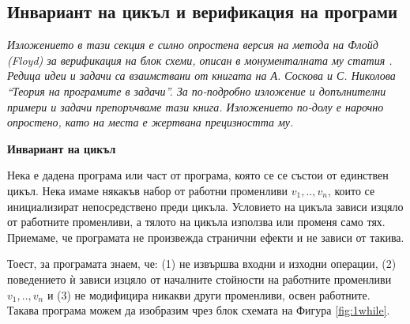 {\begin{enumerate}[resume]
\end{enumerate}

\subsection{Инвариант на цикъл и верификация на програми}

\emph{Изложението в тази секция е силно опростена версия на метода на Флойд (Floyd) за верификация на блок схеми, описан в монументалната му статия \cite{floyd}. Редица идеи и задачи са взаимствани от книгата \cite{tpsbornik} на А. Соскова и С. Николова ``Теория на програмите в задачи''. За по-подробно изложение и допълнителни примери и задачи препоръчваме тази книга. Изложението по-долу е нарочно опростено, като на места е жертвана прецизността му.}

\begin{mdframed}[hidealllines=true,backgroundcolor=gray!20]


\bigskip
\textbf{Инвариант на цикъл}
\bigskip


Нека е дадена програма или част от програма, която се се състои от единствен  цикъл. Нека имаме някакъв набор от работни променливи $v_1,..,v_n$, които се инициализират непосредствено преди  цикъла. Условието на цикъла зависи изцяло от работните променливи, а тялото на цикъла използва или променя само тях. Приемаме, че програмата не произвежда странични ефекти и не зависи от такива.

Тоест, за програмата знаем, че: (1) не извършва входни и изходни операции, (2) поведението ѝ зависи изцяло от началните стойности на работните променливи $v_1,..,v_n$ и (3) не модифицира никакви други променливи, освен работните. Такава програма можем да изобразим чрез блок схемата на Фигура \ref{fig:1while}.
\end{mdframed}


\begin{figure}
\end{figure}}
